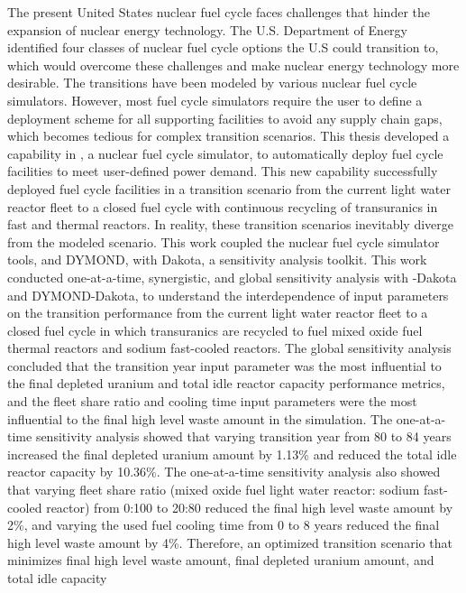 The present United States nuclear fuel cycle faces challenges that hinder 
the expansion of nuclear energy technology. 
The U.S. Department of Energy identified four classes of nuclear fuel cycle 
options the U.S could transition to, which would overcome these challenges 
and make nuclear energy technology more desirable. 
The transitions have been modeled by various nuclear fuel cycle simulators. 
However, most fuel cycle simulators require the user to define a deployment 
scheme for all supporting facilities to avoid any supply chain gaps, which becomes 
tedious for complex transition scenarios.
This thesis developed a capability in \Cyclus, a nuclear fuel cycle simulator, 
to automatically deploy fuel cycle 
facilities to meet user-defined power demand. 
This new capability successfully deployed fuel cycle facilities
in a transition scenario from the current 
light water reactor fleet to a closed fuel cycle with continuous recycling of transuranics in fast and 
thermal reactors.
In reality, these transition scenarios inevitably diverge from the 
modeled scenario. 
This work coupled the nuclear fuel cycle simulator tools, \Cyclus and DYMOND, 
with Dakota, a sensitivity analysis toolkit. 
This work conducted one-at-a-time, synergistic, and 
global sensitivity analysis with \Cyclus-Dakota and DYMOND-Dakota,
to understand the interdependence of input parameters on the  
transition performance from the current 
light water reactor fleet to a closed fuel cycle in which transuranics are recycled to fuel 
mixed oxide fuel thermal reactors and sodium fast-cooled reactors. 
The global sensitivity analysis concluded that 
the transition year input parameter was the most influential
to the final depleted uranium and total idle reactor capacity 
performance metrics, and  
the fleet share ratio and cooling time input parameters 
were the most influential to the final high level waste amount in the 
simulation. 
The one-at-a-time sensitivity analysis showed that varying transition 
year from 80 to 84 years increased the final depleted uranium amount by 
1.13\% and reduced the total idle reactor capacity by 10.36\%. 
The one-at-a-time sensitivity analysis also showed that varying 
fleet share ratio 
(mixed oxide fuel light water reactor: sodium fast-cooled reactor) 
from 0:100 to 20:80 reduced the 
final high level waste amount by 2\%, and varying the used fuel cooling time from 0 to 
8 years reduced the final high level waste amount by 4\%. 
Therefore, an optimized transition scenario that minimizes final 
high level waste amount, final depleted uranium amount, and total idle capacity 
